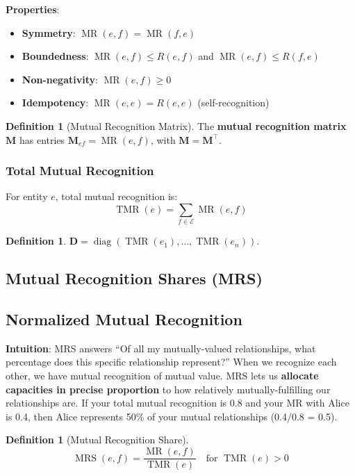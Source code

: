 \documentclass[11pt,a4paper]{article}
\theoremstyle{definition}
\newtheorem{definition}[theorem]{Definition}
\theoremstyle{remark}
\newcommand{\E}{\mathcal{E}}
\DeclareMathOperator{\TMR}{TMR}
\DeclareMathOperator{\MR}{MR}
\DeclareMathOperator{\MRS}{MRS}
\begin{document}
\textbf{Properties}:
\begin{itemize}
\item \textbf{Symmetry}: $\MR(e,f) = \MR(f,e)$
\item \textbf{Boundedness}: $\MR(e,f) \le R(e,f)$ and $\MR(e,f) \le R(f,e)$
\item \textbf{Non-negativity}: $\MR(e,f) \ge 0$
\item \textbf{Idempotency}: $\MR(e,e) = R(e,e)$ (self-recognition)
\end{itemize}

\begin{definition}[Mutual Recognition Matrix]
The \textbf{mutual recognition matrix} $\mathbf{M}$ has entries $\mathbf{M}_{ef} = \MR(e,f)$, with $\mathbf{M} = \mathbf{M}^\top$.
\end{definition}

\subsubsection{Total Mutual Recognition}

For entity $e$, total mutual recognition is:
\[ \TMR(e) = \sum_{f \in \E} \MR(e,f) \]

\begin{definition}
$\mathbf{D} = \operatorname{diag}(\TMR(e_1), \dots, \TMR(e_n))$.
\end{definition}

\subsection{Mutual Recognition Shares (MRS)}

\subsection{Normalized Mutual Recognition}

\textbf{Intuition}: MRS answers ``Of all my mutually-valued relationships, what percentage does this specific relationship represent?'' When we recognize each other, we have mutual recognition of mutual value. MRS lets us \textbf{allocate capacities in precise proportion} to how relatively mutually-fulfilling our relationships are. If your total mutual recognition is 0.8 and your MR with Alice is 0.4, then Alice represents 50\% of your mutual relationships (0.4/0.8 = 0.5).

\begin{definition}[Mutual Recognition Share]
\[ \MRS(e,f) = \frac{\MR(e,f)}{\TMR(e)} \quad \text{for } \TMR(e) > 0 \]
\end{definition}
\end{document}
